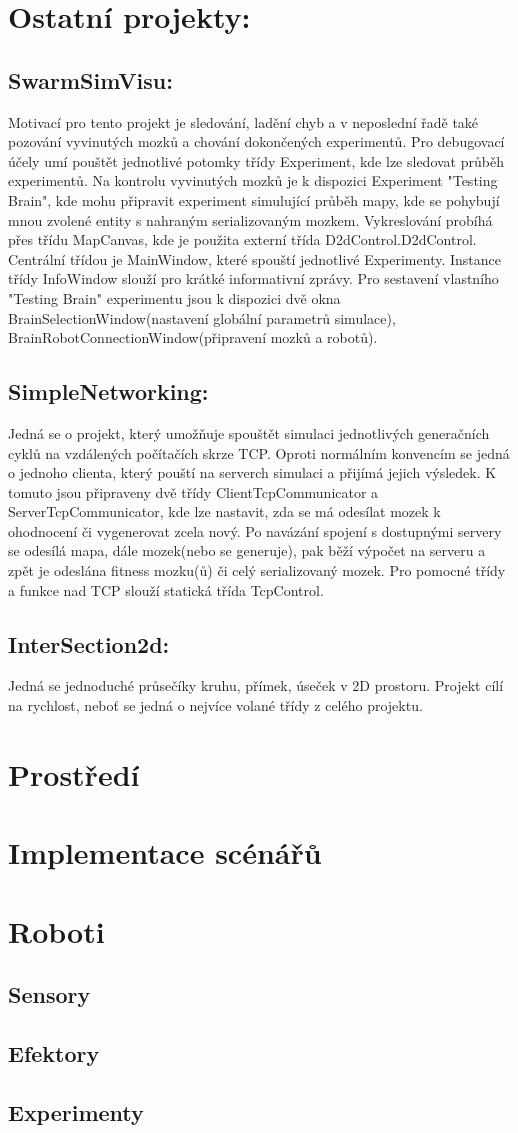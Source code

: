 \documentclass[12pt, oneside]{article}
\begin{document}
\newpage
\section{Ostatní projekty:}
\subsection{SwarmSimVisu:}
Motivací pro tento projekt je sledování, ladění chyb a v neposlední řadě také pozování vyvinutých mozků a chování dokončených experimentů. Pro debugovací účely umí pouštět jednotlivé potomky třídy Experiment, kde lze sledovat průběh experimentů. Na kontrolu vyvinutých mozků je k dispozici Experiment "Testing Brain", kde mohu připravit experiment simulující průběh mapy, kde se pohybují mnou zvolené entity s nahraným serializovaným mozkem. Vykreslování probíhá přes třídu MapCanvas, kde je použita externí třída D2dControl.D2dControl. Centrální třídou je MainWindow, které spouští jednotlivé Experimenty. Instance třídy InfoWindow slouží pro krátké informativní zprávy. Pro sestavení vlastního "Testing Brain" experimentu jsou k dispozici dvě okna BrainSelectionWindow(nastavení globální parametrů simulace), BrainRobotConnectionWindow(připravení mozků a robotů). 
\subsection{SimpleNetworking:} 
Jedná se o projekt, který umožňuje spouštět simulaci jednotlivých generačních cyklů na vzdálených počítačích skrze TCP. Oproti normálním konvencím se jedná o jednoho clienta, který pouští na serverch simulaci a přijímá jejich výsledek. K tomuto jsou připraveny dvě třídy ClientTcpCommunicator a ServerTcpCommunicator, kde lze nastavit, zda se má odesílat mozek k ohodnocení či vygenerovat zcela nový. Po navázání spojení s dostupnými servery se odesílá mapa, dále mozek(nebo se generuje), pak běží výpočet na serveru a zpět je odeslána fitness mozku(ů) či celý serializovaný mozek. Pro pomocné třídy a funkce nad TCP slouží statická třída TcpControl.
\subsection{InterSection2d:}
Jedná se  jednoduché průsečíky kruhu, přímek, úseček v 2D prostoru. Projekt cílí na rychlost, neboť se jedná o nejvíce volané třídy z celého projektu.
  
\section{Prostředí}
\section{Implementace scénářů}
\section{Roboti}
\subsection{Sensory}
\subsection{Efektory}
\subsection{Experimenty}
\end{document}
